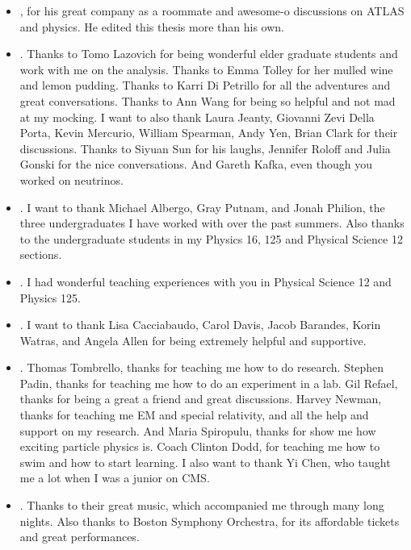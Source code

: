 \begin{itemize}
	\item {}, for his great company as a roommate and awesome-o discussions on ATLAS and physics. He edited this thesis more than his own.
	\item {}. Thanks to Tomo Lazovich for being wonderful elder graduate students and work with me on the analysis. Thanks to Emma Tolley for her mulled wine and lemon pudding. Thanks to Karri Di Petrillo for all the adventures and great conversations. Thanks to Ann Wang for being so helpful and not mad at my mocking. I want to also thank Laura Jeanty, Giovanni Zevi Della Porta, Kevin Mercurio, William Spearman, Andy Yen, Brian Clark for their discussions. Thanks to Siyuan Sun for his laughs, Jennifer Roloff and Julia Gonski for the nice conversations. And Gareth Kafka, even though you worked on neutrinos.
	\item {}. I want to thank Michael Albergo, Gray Putnam, and Jonah Philion, the three undergraduates I have worked with over the past summers. Also thanks to the undergraduate students in my Physics 16, 125 and Physical Science 12 sections.
	\item {}. I had wonderful teaching experiences with you in Physical Science 12 and Physics 125.
	\item {}. I want to thank Lisa Cacciabaudo, Carol Davis, Jacob Barandes, Korin Watras, and Angela Allen for being extremely helpful and supportive.
	\item {}. Thomas Tombrello, thanks for teaching me how to do research. Stephen Padin, thanks for teaching me how to do an experiment in a lab. Gil Refael, thanks for being a great a friend and great discussions. Harvey Newman, thanks for teaching me EM and special relativity, and all the help and support on my research. And Maria Spiropulu, thanks for show me how exciting particle physics is. Coach Clinton Dodd, for teaching me how to swim and how to start learning. I also want to thank Yi Chen, who taught me a lot when I was a junior on CMS.
	\item {}. Thanks to their great music, which accompanied me through many long nights. Also thanks to Boston Symphony Orchestra, for its affordable tickets and great performances.

\end{itemize}
